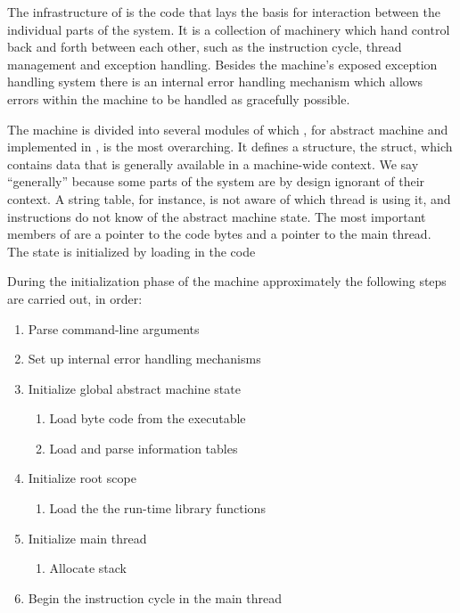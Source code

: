 

The infrastructure of \thename{} is the code that lays the basis for interaction
between the individual parts of the system. It is a collection of machinery
which hand control back and forth between each other, such as the instruction
cycle, thread management and exception handling. Besides the machine's exposed
exception handling system there is an internal error handling mechanism which
allows errors within the machine to be handled as gracefully possible.

The machine is divided into several modules of which , for abstract
machine and implemented in , is the most overarching. It defines a
structure, the  struct, which contains data that is generally
available in a machine-wide context. We say ``generally'' because some parts of
the system are by design ignorant of their context. A string table, for
instance, is not aware of which thread is using it, and instructions do not know
of the abstract machine state. The most important members of 
are a pointer to the code bytes and a pointer to the main thread. The state is
initialized by loading in the code %

During the initialization phase of the machine approximately the following steps
are carried out, in order: %

\begin{enumerate}
\item Parse command-line arguments
\item Set up internal error handling mechanisms
\item Initialize global abstract machine state
  \begin{enumerate}
  \item Load byte code from the executable
  \item Load and parse information tables
  \end{enumerate}
\item Initialize root scope
  \begin{enumerate}
  \item Load the the run-time library functions
  \end{enumerate}
\item Initialize main thread
  \begin{enumerate}
  \item Allocate stack
  \end{enumerate}
\item Begin the instruction cycle in the main thread
\end{enumerate}

